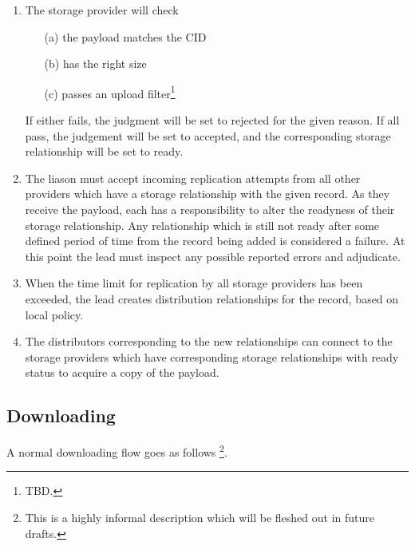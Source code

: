 \documentclass{article}
\begin{document}
\begin{enumerate}
\item
The storage provider will check

      \begin{itemize}

      \item[(a)] the payload matches the CID

      \item[(b)] has the right size

      \item[(c)] passes an upload filter\footnote{TBD.}

      \end{itemize}

If either fails, the judgment will be set to rejected for the given reason. If all pass, the judgement will be set to accepted, and the corresponding storage relationship will be set to ready.

\item
The liason must accept incoming replication attempts from all other providers which have a storage relationship with the given record. As they receive the payload, each has a responsibility to alter the readyness of their storage relationship. Any relationship which is still not ready after some defined period of time from the record being added is considered a failure. At this point the lead must inspect any possible reported errors and adjudicate.

\item
When the time limit for replication by all storage providers has been exceeded, the lead creates distribution relationships for the record, based on local policy.

\item
The distributors corresponding to the new relationships can connect to the storage providers which have corresponding storage relationships with ready status to acquire a copy of the payload.

\end{enumerate}

\subsection{Downloading}

A normal downloading flow goes as follows \footnote{This is a highly informal description which will be fleshed out in future drafts.}.

\end{document}
